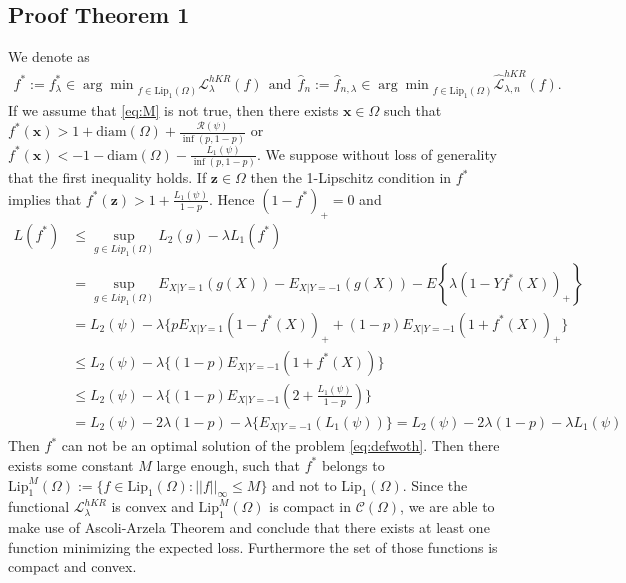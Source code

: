 \subsection{Proof Theorem 1}
We denote as 
\begin{align}\label{eq:defwoth}
	f^*:=f_{\lambda}^*\in{\arg\min}_{f\in \text{Lip}_1(\Omega)}\mathcal{L}^{hKR}_\lambda(f)\ \ \text{and} \ \ \hat{f}_n:=\hat{f}_{n,\lambda}\in{\arg\min}_{f\in \text{Lip}_1(\Omega)}\hat{\mathcal{L}}^{hKR}_{\lambda,n}(f).
\end{align}
If we assume that \eqref{eq:M} is not true, then there exists $\textbf{x}\in \Omega$ such that $f^*(\textbf{x})>1+\text{diam}(\Omega)+\frac{\mathcal{R}(\psi)}{\inf(p,1-p)}$ or $f^*(\textbf{x})<-1-\text{diam}(\Omega)-\frac{L_1(\psi)}{\inf(p,1-p)}$. We suppose without loss of generality that the first inequality holds. If ${{\textbf{z}}}\in \Omega $ then the 1-Lipschitz condition in $f^*$ implies that $f^*({{\textbf{z}}})>1+\frac{L_1(\psi)}{1-p}$. Hence $(1-f^*)_+=0$ and
\begin{align*}
	L(f^*)&\leq \sup_{g\in Lip_1(\Omega)} L_2(g)- \lambda L_1(f^*)\\
	&=\sup_{g\in Lip_1(\Omega)}E_{X|Y=1}(g(X))-E_{X|Y=-1}(g(X))-E\left\{\lambda (1-Yf^*(X))_+\right\}\\
	&= L_2(\psi)-\lambda \{ pE_{X|Y=1}(1-f^*(X))_++(1-p)E_{X|Y=-1}(1+f^*(X))_+\}\\
	&\leq L_2(\psi)-\lambda \{ (1-p)E_{X|Y=-1}(1+f^*(X))\}\\
	&\leq  L_2(\psi)-\lambda \{ (1-p)E_{X|Y=-1}(2+\frac{L_1(\psi)}{1-p})\} \\
	&= L_2(\psi)-2\lambda(1-p) -\lambda \{ E_{X|Y=-1}({L_1(\psi)})\}=L_2(\psi)-2\lambda(1-p)-\lambda L_1(\psi) 
\end{align*}
Then $f^*$ can not be an optimal solution of the problem \eqref{eq:defwoth}. Then there exists some constant $M$ large enough, such that $f^*$ belongs to $\text{Lip}^M_1(\Omega):=\{f\in \text{Lip}_1(\Omega): || f||_{\infty}\leq M\}$ and not to $\text{Lip}_1(\Omega)$. Since the functional $\mathcal{L}^{hKR}_\lambda$ is convex and $\text{Lip}^M_1(\Omega)$ is compact in $\mathcal{C}(\Omega)$, we are able to make use of Ascoli-Arzela Theorem and conclude that there exists at least one function minimizing the expected loss. Furthermore the set of those functions is compact and convex.


